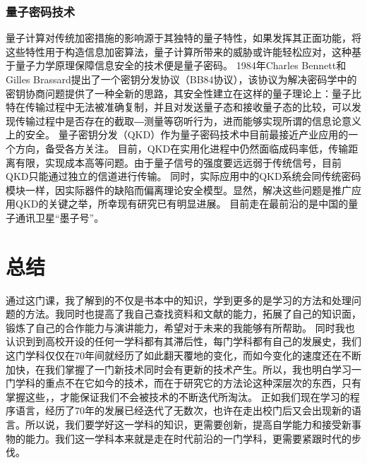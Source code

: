 \documentclass{article}
\begin{document}
\subsubsection{量子密码技术}
量子计算对传统加密措施的影响源于其独特的量子特性，如果发挥其正面功能，将这些特性用于构造信息加密算法，量子计算所带来的威胁或许能轻松应对，这种基于量子力学原理保障信息安全的技术便是量子密码。
1984年Charles Bennett和Gilles Brassard提出了一个密钥分发协议（BB84协议），该协议为解决密码学中的密钥协商问题提供了一种全新的思路，其安全性建立在这样的量子理论上：量子比特在传输过程中无法被准确复制，并且对发送量子态和接收量子态的比较，可以发现传输过程中是否存在的截取―测量等窃听行为，进而能够实现所谓的信息论意义上的安全。
量子密钥分发（QKD）作为量子密码技术中目前最接近产业应用的一个方向，备受各方关注。
目前，QKD在实用化进程中仍然面临成码率低，传输距离有限，实现成本高等问题。由于量子信号的强度要远远弱于传统信号，目前QKD只能通过独立的信道进行传输。
同时，实际应用中的QKD系统会同传统密码模块一样，因实际器件的缺陷而偏离理论安全模型。显然，解决这些问题是推广应用QKD的关键之举，所幸现有研究已有明显进展。
目前走在最前沿的是中国的量子通讯卫星“墨子号”。
\section{总结}
通过这门课，我了解到的不仅是书本中的知识，学到更多的是学习的方法和处理问题的方法。我同时也提高了我自己查找资料和文献的能力，拓展了自己的知识面，锻炼了自己的合作能力与演讲能力，希望对于未来的我能够有所帮助。
同时我也认识到到高校开设的任何一学科都有其滞后性，每门学科都有自己的发展史，我们这门学科仅仅在70年间就经历了如此翻天覆地的变化，而如今变化的速度还在不断加快，在我们掌握了一门新技术同时会有更新的技术产生。所以，我也明白学习一门学科的重点不在它如今的技术，而在于研究它的方法论这种深层次的东西，只有掌握这些，，才能保证我们不会被技术的不断迭代所淘汰。
正如我们现在学习的程序语言，经历了70年的发展已经迭代了无数次，也许在走出校门后又会出现新的语言。所以说，我们要学好这一学科的知识，更需要创新，提高自学能力和接受新事物的能力。我们这一学科本来就是走在时代前沿的一门学科，更需要紧跟时代的步伐。\par


\end{document}
